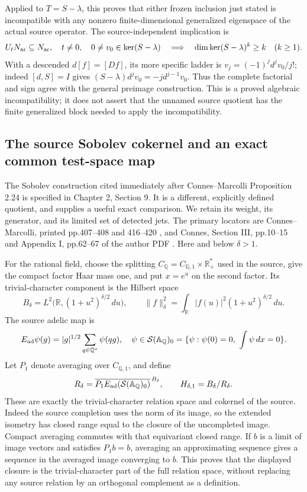 Applied to $T=S-\lambda$, this proves that either frozen
inclusion just stated is incompatible with any nonzero
finite-dimensional generalized eigenspace of the actual source
operator. The source-independent implication is
\begin{equation}
\begin{gathered}
 U_tN_{\rm ar}\subseteq N_{\rm ar},\quad t\ne0,\quad
                  0\ne v_0\in\ker(S-\lambda)
 \quad\Longrightarrow\quad
 \dim\ker(S-\lambda)^k\geq k\quad(k\geq1).
\end{gathered}
\label{csq:eq-source-surjective-chain}
\end{equation}
With a descended $d[f]=[Df]$, its more specific ladder is
$v_j=(-1)^jd^jv_0/j!$; indeed
$[d,S]=I$ gives $(S-\lambda)d^jv_0=-j d^{j-1}v_0$.
Thus the complete factorial and sign agree with the general
preimage construction. This is a proved algebraic incompatibility;
it does not assert that the unnamed source quotient has the
finite generalized block needed to apply the incompatibility.

\subsection{The source Sobolev cokernel and an exact common test-space map}
\label{csq:sec-sobolev-comparison}
The Sobolev construction cited immediately after Connes--Marcolli
Proposition 2.24 is specified in Chapter 2, Section 9. It is a different,
explicitly defined quotient, and supplies a useful exact comparison.
We retain its weight, its generator, and its limited set of detected jets.
The primary locators are Connes--Marcolli, printed pp.407--408 and
416--420 \cite{connesMarcolli2008}, and Connes, Section III, pp.10--15 and
Appendix I, pp.62--67 of the author PDF \cite{connesSelecta1999}.
Here and below $\delta>1$.

For the rational field, choose the splitting
$C_{\mathbb Q}=C_{\mathbb Q,1}\times\mathbb R_+^*$ used in the source,
give the compact factor Haar mass one, and put $x=e^u$ on the second
factor. Its trivial-character component is the Hilbert space
\[
 B_\delta=L^2\bigl(\mathbb R,(1+u^2)^{\delta/2}\,du\bigr),
 \qquad
 \|f\|_\delta^2=\int_{\mathbb R}|f(u)|^2(1+u^2)^{\delta/2}\,du.
\]
The source adelic map is
\[
 E_{\rm ad}\psi(g)=|g|^{1/2}\sum_{q\in\mathbb Q^*}\psi(qg),
 \quad
 \psi\in\mathcal S(\mathbb A_{\mathbb Q})_0
 =\{\psi:\psi(0)=0,\ \int\psi\,dx=0\}.
\]
Let $P_1$ denote averaging over $C_{\mathbb Q,1}$, and define
\[
 R_\delta=\overline{P_1E_{\rm ad}
             (\mathcal S(\mathbb A_{\mathbb Q})_0)}^{\,B_\delta},
 \qquad H_{\delta,1}=B_\delta/R_\delta.
\]
These are exactly the trivial-character relation space and cokernel
of the source. Indeed the source completion uses the norm of its image,
so the extended isometry has closed range equal to the closure of the
uncompleted image. Compact averaging commutes with that equivariant
closed range. If $b$ is a limit of image vectors and satisfies $P_1b=b$,
averaging an approximating sequence gives a sequence in the averaged
image converging to $b$. This proves that the displayed closure is the
trivial-character part of the full relation space, without replacing
any source relation by an orthogonal complement as a definition.

